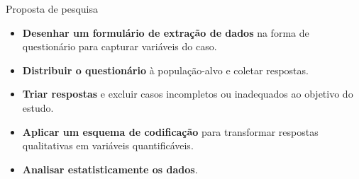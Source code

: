 \begin{frame}{Proposta de pesquisa}
\begin{itemize}
    \item \textbf{Desenhar um formulário de extração de dados} na forma de questionário para capturar variáveis do caso.
    \item \textbf{Distribuir o questionário} à população-alvo e coletar respostas.
    \item \textbf{Triar respostas} e excluir casos incompletos ou inadequados ao objetivo do estudo.
    \item \textbf{Aplicar um esquema de codificação} para transformar respostas qualitativas em variáveis quantificáveis.
    \item \textbf{Analisar estatisticamente os dados}. 
\end{itemize}
\end{frame}
